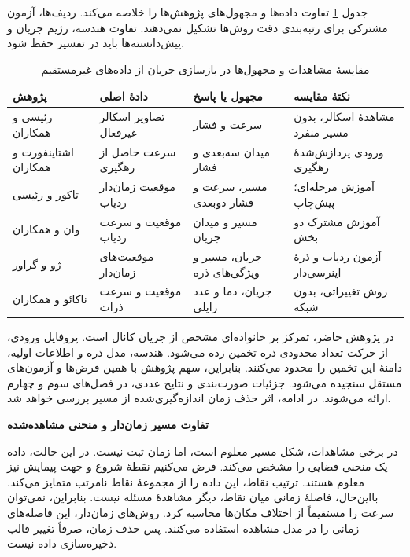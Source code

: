 جدول \ref{tab:lit-timed-flow-comparison} تفاوت داده‌ها و مجهول‌های پژوهش‌ها را خلاصه می‌کند.
ردیف‌ها، آزمون مشترکی برای رتبه‌بندی دقت روش‌ها تشکیل نمی‌دهند.
تفاوت هندسه، رژیم جریان و پیش‌دانسته‌ها باید در تفسیر حفظ شود.

\begin{table}[htbp]
\centering
\small
\caption{مقایسهٔ مشاهدات و مجهول‌ها در بازسازی جریان از داده‌های غیرمستقیم}
\label{tab:lit-timed-flow-comparison}
\setlength{\tabcolsep}{5pt}
\begin{tabular}{p{}p{}p{}p{}}
\hline
پژوهش & دادهٔ اصلی & مجهول یا پاسخ & نکتهٔ مقایسه \\
\hline
رئیسی و همکاران \cite{Raissi2020HFM}
& تصاویر اسکالر غیرفعال
& سرعت و فشار
& مشاهدهٔ اسکالر، بدون مسیر منفرد \\
اشتاینفورت و همکاران \cite{Steinfurth2024}
& سرعت حاصل از رهگیری
& میدان سه‌بعدی و فشار
& ورودی پردازش‌شدهٔ رهگیری \\
تاکور و رئیسی \cite{Thakur2025ELPINN}
& موقعیت زمان‌دار ردیاب
& مسیر، سرعت و فشار دوبعدی
& آموزش مرحله‌ای؛ پیش‌چاپ \\
وان و همکاران \cite{Wan2026TrajectoryFlowNet}
& موقعیت و سرعت ردیاب
& مسیر و میدان جریان
& آموزش مشترک دو بخش \\
ژو و گراور \cite{ZhouGrauer2026Joint}
& موقعیت‌های زمان‌دار
& جریان، مسیر و ویژگی‌های ذره
& آزمون ردیاب و ذرهٔ اینرسی‌دار \\
ناکائو و همکاران \cite{Nakao2025LagrangianDA}
& موقعیت و سرعت ذرات
& جریان، دما و عدد رایلی
& روش تغییراتی، بدون شبکه \\
\hline
\end{tabular}
\end{table}

در پژوهش حاضر، تمرکز بر خانواده‌ای مشخص از جریان کانال است.
پروفایل ورودی، از حرکت تعداد محدودی ذره تخمین زده می‌شود.
هندسه، مدل ذره و اطلاعات اولیه، دامنهٔ این تخمین را محدود می‌کنند.
بنابراین، سهم پژوهش با همین فرض‌ها و آزمون‌های مستقل سنجیده می‌شود.
جزئیات صورت‌بندی و نتایج عددی، در فصل‌های سوم و چهارم ارائه می‌شوند.
در ادامه، اثر حذف زمان اندازه‌گیری‌شده از مسیر بررسی خواهد شد.

\label{sec:lit-untimed-flow-inverse}

\textbf{تفاوت مسیر زمان‌دار و منحنی مشاهده‌شده}

در برخی مشاهدات، شکل مسیر معلوم است، اما زمان ثبت نیست.
در این حالت، داده یک منحنی فضایی را مشخص می‌کند.
فرض می‌کنیم نقطهٔ شروع و جهت پیمایش نیز معلوم هستند.
ترتیب نقاط، این داده را از مجموعهٔ نقاط نامرتب متمایز می‌کند.
بااین‌حال، فاصلهٔ زمانی میان نقاط، دیگر مشاهدهٔ مسئله نیست.
بنابراین، نمی‌توان سرعت را مستقیماً از اختلاف مکان‌ها محاسبه کرد.
روش‌های زمان‌دار، این فاصله‌های زمانی را در مدل مشاهده استفاده می‌کنند.
پس حذف زمان، صرفاً تغییر قالب ذخیره‌سازی داده نیست.
\cite{ZhouGrauer2026Joint}

